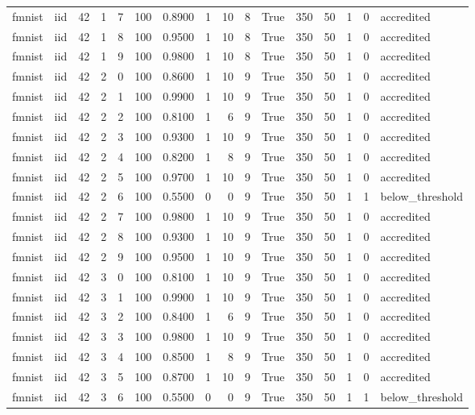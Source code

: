 \begin{tabular}{llrrrrrrrrrrrrrl}
fmnist & iid & 42 & 1 & 7 & 100 & 0.8900 & 1 & 10 & 8 & True & 350 & 50 & 1 & 0 & accredited \\
fmnist & iid & 42 & 1 & 8 & 100 & 0.9500 & 1 & 10 & 8 & True & 350 & 50 & 1 & 0 & accredited \\
fmnist & iid & 42 & 1 & 9 & 100 & 0.9800 & 1 & 10 & 8 & True & 350 & 50 & 1 & 0 & accredited \\
fmnist & iid & 42 & 2 & 0 & 100 & 0.8600 & 1 & 10 & 9 & True & 350 & 50 & 1 & 0 & accredited \\
fmnist & iid & 42 & 2 & 1 & 100 & 0.9900 & 1 & 10 & 9 & True & 350 & 50 & 1 & 0 & accredited \\
fmnist & iid & 42 & 2 & 2 & 100 & 0.8100 & 1 & 6 & 9 & True & 350 & 50 & 1 & 0 & accredited \\
fmnist & iid & 42 & 2 & 3 & 100 & 0.9300 & 1 & 10 & 9 & True & 350 & 50 & 1 & 0 & accredited \\
fmnist & iid & 42 & 2 & 4 & 100 & 0.8200 & 1 & 8 & 9 & True & 350 & 50 & 1 & 0 & accredited \\
fmnist & iid & 42 & 2 & 5 & 100 & 0.9700 & 1 & 10 & 9 & True & 350 & 50 & 1 & 0 & accredited \\
fmnist & iid & 42 & 2 & 6 & 100 & 0.5500 & 0 & 0 & 9 & True & 350 & 50 & 1 & 1 & below\_threshold \\
fmnist & iid & 42 & 2 & 7 & 100 & 0.9800 & 1 & 10 & 9 & True & 350 & 50 & 1 & 0 & accredited \\
fmnist & iid & 42 & 2 & 8 & 100 & 0.9300 & 1 & 10 & 9 & True & 350 & 50 & 1 & 0 & accredited \\
fmnist & iid & 42 & 2 & 9 & 100 & 0.9500 & 1 & 10 & 9 & True & 350 & 50 & 1 & 0 & accredited \\
fmnist & iid & 42 & 3 & 0 & 100 & 0.8100 & 1 & 10 & 9 & True & 350 & 50 & 1 & 0 & accredited \\
fmnist & iid & 42 & 3 & 1 & 100 & 0.9900 & 1 & 10 & 9 & True & 350 & 50 & 1 & 0 & accredited \\
fmnist & iid & 42 & 3 & 2 & 100 & 0.8400 & 1 & 6 & 9 & True & 350 & 50 & 1 & 0 & accredited \\
fmnist & iid & 42 & 3 & 3 & 100 & 0.9800 & 1 & 10 & 9 & True & 350 & 50 & 1 & 0 & accredited \\
fmnist & iid & 42 & 3 & 4 & 100 & 0.8500 & 1 & 8 & 9 & True & 350 & 50 & 1 & 0 & accredited \\
fmnist & iid & 42 & 3 & 5 & 100 & 0.8700 & 1 & 10 & 9 & True & 350 & 50 & 1 & 0 & accredited \\
fmnist & iid & 42 & 3 & 6 & 100 & 0.5500 & 0 & 0 & 9 & True & 350 & 50 & 1 & 1 & below\_threshold \\

\end{tabular}
